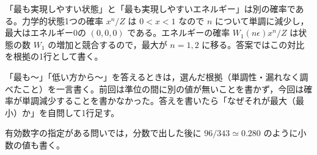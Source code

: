 \item 「最も実現しやすい状態」と「最も実現しやすいエネルギー」は別の確率である。力学的状態1つの確率 $x^{n}/Z$ は $0<x<1$ なので $n$ について単調に減少し，最大はエネルギー0の $(0,0,0)$ である。エネルギーの確率 $W_{1}(n\epsilon)x^{n}/Z$ は状態の数 $W_{1}$ の増加と競合するので，最大が $n=1,2$ に移る。答案ではこの対比を根拠の1行として書く。
\item {} 「最も〜」「低い方から〜」を答えるときは，選んだ根拠（単調性・漏れなく調べたこと）を一言書く。前回は準位の間に別の値が無いことを書かず，今回は確率が単調減少することを書かなかった。答えを書いたら「なぜそれが最大（最小）か」を自問して1行足す。
\item 有効数字の指定がある問いでは，分数で出した後に $96/343\simeq\num{0.280}$ のように小数の値も書く。
